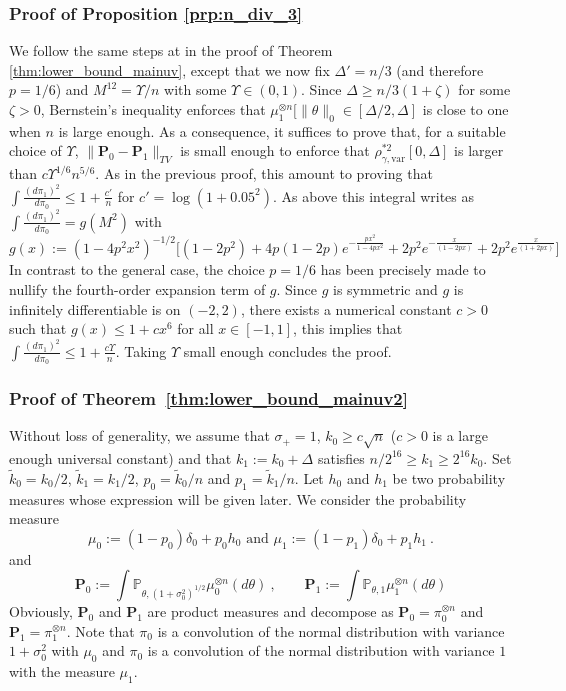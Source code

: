 \documentclass[twoside,11pt]{article}
\def\beq{\begin{equation}}
\def\eeq{\end{equation}}
\newcommand{\<}{\langle}
\renewcommand{\>}{\rangle}
\begin{document}
\subsubsection{Proof of Proposition \ref{prp:n_div_3}}

 We follow the same steps at in the proof of Theorem \ref{thm:lower_bound_mainuv}, except that we now fix $\Delta'=n/3$ (and therefore $p=1/6$) and $M^{12}= \Upsilon/ n$ with some $\Upsilon\in (0,1)$. Since $\Delta\geq n/3 (1+\zeta)$ for some $\zeta>0$, 
 Bernstein's inequality enforces that  $\mu_1^{\otimes n}[\|\theta\|_0\in [\Delta/2,\Delta]$ is close to one when $n$ is large enough. As a consequence, it suffices to prove that, for a suitable choice of $\Upsilon$, $\|\mathbf{P}_0-\mathbf{P}_1\|_{TV}$ is small enough to enforce that $\rho^{*2}_{\gamma,\mathrm{var}}[0,\Delta]$ is larger than $c \Upsilon^{1/6} n^{5/6}$. As in the previous proof, this amount to proving that $\int \frac{(d\pi_1)^2}{d\pi_0}\leq 1+ \frac{c'}{n}$ for $c'=  \log(1+0.05^2)$.  As above this integral writes as $\int \frac{(d\pi_1)^2}{d\pi_0} = g(M^2)$ with 
 \[
  g(x):= (1-4p^2x^2)^{-1/2}\Big[(1-2p^2)+ 4p(1-2p)e^{-\frac{px^2}{1-4px^2}} + 2p^2e^{-\frac{x}{(1-2px)}} + 2p^2e^{\frac{x}{(1+2px)}} \Big]
 \]
In contrast to the general case, the choice $p=1/6$ has been precisely made to nullify the fourth-order expansion term of $g$. Since $g$ is symmetric and $g$ is infinitely differentiable is on $(-2,2)$, there exists a numerical constant $c>0$ such that $g(x)\leq 1 + c x^6$ for all $x\in [-1,1]$, this implies that $\int \frac{(d\pi_1)^2}{d\pi_0}\leq 1+ \frac{c\Upsilon}{n}$. Taking $\Upsilon$ small enough concludes the proof.
 
 




 
 

\subsubsection{Proof of Theorem~\ref{thm:lower_bound_mainuv2}}




Without loss of generality, we assume that $\sigma_+=1$,  $k_0 \geq c \sqrt{n}$ ($c>0$ is a large enough universal constant) and  that $k_1:= k_0+\Delta $ satisfies $n/2^{16} \geq k_1\geq 2^{16}k_0$.  Set $\tilde k_0 = k_0/2$,  $\tilde k_1 = k_1/2$, $p_0= \tilde k_0/n$ and $p_1=\tilde k_1/n$.
Let $h_0$ and $h_1$ be two probability measures whose expression will be given later.  We consider the probability measure 
\beq\label{eq:definition_mu_1_uv}
\mu_0:=(1-p_0) \delta_0 + p_0 h_0  \text{ and }\mu_1 := (1 -p_1)\delta_0 + p_1 h_1\ .
\eeq
and 
\[
 \mathbf{P}_0:=  \int \mathbb{P}_{\theta,(1+\sigma_0^2)^{1/2}} \mu_0^{\otimes n}(d\theta) \ ,\quad \quad  \mathbf{P}_1:= \int \mathbb{P}_{\theta,1} \mu_1^{\otimes n}(d\theta)
\]
Obviously, $\mathbf{P}_0$ and $\mathbf{P}_1$ are product measures and decompose as $\mathbf{P}_0=\pi_0^{\otimes n}$ and $\mathbf{P}_1= \pi_1^{\otimes n}$. Note that $\pi_0$ is a convolution of the normal distribution with variance $1+\sigma_0^2$ with $\mu_0$ and $\pi_0$ is a convolution of the normal distribution with variance $1$ with the measure $\mu_1$.
\end{document}
